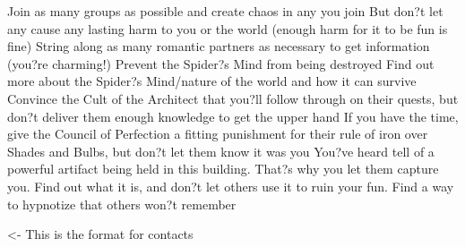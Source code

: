 \documentclass[char]{Silversiders}
\begin{document}
\name{\cTrickster{}}

Join as many groups as possible and create chaos in any you join
But don?t let any cause any lasting harm to you or the world (enough harm for it to be fun is fine)
String along as many romantic partners as necessary to get information (you?re charming!)
Prevent the Spider?s Mind from being destroyed
Find out more about the Spider?s Mind/nature of the world and how it can survive
Convince the Cult of the Architect that you?ll follow through on their quests, but don?t deliver them enough knowledge to get the upper hand
If you have the time, give the Council of Perfection a fitting punishment for their rule of iron over Shades and Bulbs, but don?t let them know it was you
You?ve heard tell of a powerful artifact being held in this building. That?s why you let them capture you. Find out what it is, and don?t let others use it to ruin your fun.
Find a way to hypnotize that others won?t remember

\begin{itemz}[Goals]
	\item 
\end{itemz}

\begin{itemz}[Notes]
	\item 
\end{itemz}

\begin{contacts}
	\contact{\cTest{}} <- This is the format for contacts 
\end{contacts}
\end{document}
